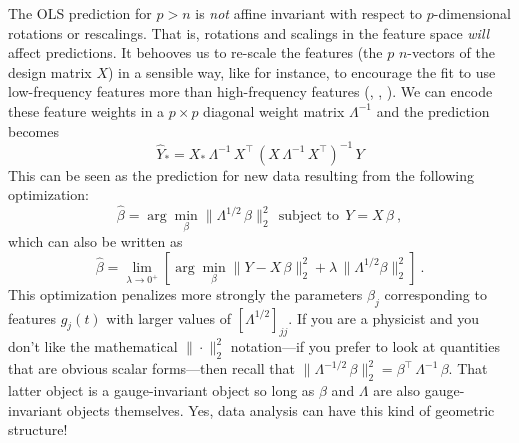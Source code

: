 \documentclass[12pt,letterpaper]{article}
\begin{document}
The OLS prediction for $p>n$ is \emph{not} affine invariant with respect to $p$-dimensional rotations or rescalings.
That is, rotations and scalings in the feature space \emph{will} affect predictions.
It behooves us to re-scale the features (the $p$ $n$-vectors of the design matrix $X$) in a sensible way, like for instance, to encourage the fit to use low-frequency features more than high-frequency features (\cite{xie2020weighted}, \cite{bah2016sample}, \cite{rauhut2016interpolation}).
We can encode these feature weights in a $p\times p$ diagonal weight matrix $\Lambda^{-1}$ and the prediction becomes
\begin{equation}
    \hat{Y}_\ast = X_\ast\,\Lambda^{-1}\,X^\top\,(X\,\Lambda^{-1}\,X^\top)^{-1}\,Y
\end{equation}
This can be seen as the prediction for new data resulting from the following optimization:
\begin{equation}
    \hat{\beta} = \arg\min_\beta \|\Lambda^{1/2}\,\beta\|_2^2 ~~\mbox{subject to}~~ Y = X\,\beta
    ~,
\end{equation}
which can also be written as
\begin{equation}
    \hat{\beta} = \lim_{\lambda\rightarrow 0^+}\left[\arg\min_\beta \|Y - X\,\beta\|_2^2 + \lambda\,\|\Lambda^{1/2}\beta\|_2^2\right]
    ~.
\end{equation}
This optimization penalizes more strongly the parameters $\beta_j$ corresponding to features $g_j(t)$ with larger values of $[\Lambda^{1/2}]_{jj}$.
If you are a physicist and you don't like the mathematical $\|\cdot\|_2^2$ notation---if you prefer to look at quantities that are obvious scalar forms---then recall that $\|\Lambda^{-1/2}\,\beta\|_2^2 = \beta^\top\,\Lambda^{-1}\,\beta$.
That latter object is a gauge-invariant object so long as $\beta$ and $\Lambda$ are also gauge-invariant objects themselves.
Yes, data analysis can have this kind of geometric structure!
\end{document}
